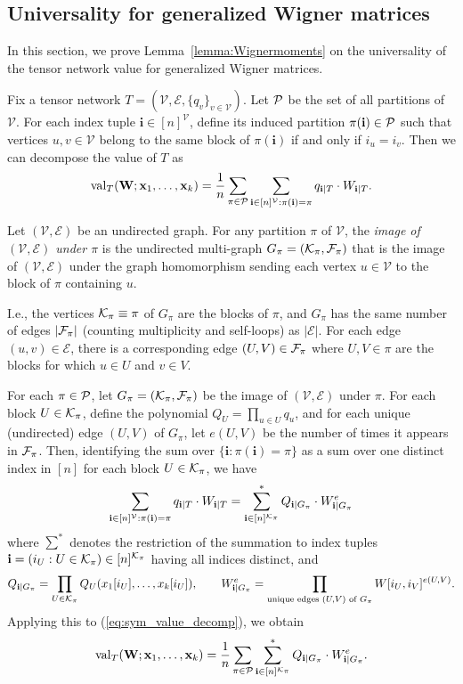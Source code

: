 \documentclass[10pt,reqno]{amsart}
\def\cV{\mathcal{V}}
\def\cE{\mathcal{E}}
\def\val{\operatorname{val}}
\def\bW{{\mathbf{W}}}
\def\bi{\mathbf{i}}
\begin{document}
\subsection{Universality for generalized Wigner matrices}\label{sec:wigner}

In this section, we prove
Lemma~\ref{lemma:Wignermoments} on the universality of the tensor
network value for generalized Wigner matrices.

Fix a tensor network $T = (\cV, \cE, \{q_v\}_{v \in \cV})$.
Let $\mathcal{P}$ be the set of all partitions of $\cV$. For each
index tuple $\bi \in [n]^\cV$, define its induced partition $\pi(\bi) \in \cP$
such that vertices $u,v \in \cV$ belong to the same block of $\pi(\bi)$
if and only if $i_u=i_v$. 
Then we can decompose the value of $T$ as
\begin{align}\label{eq:sym_value_decomp}
    \val_T(\bW; \xb_1, \ldots, \xb_k) = \frac{1}{n}
\sum_{\pi \in \cP} \sum_{\bi \in [n]^\cV:\pi(\bi)=\pi} q_{\bi|T} \cdot W_{\bi|T}.
\end{align}

\begin{definition}\label{def:graphpartition}
Let $(\cV,\cE)$ be an undirected graph. For any partition $\pi$ of $\cV$,
the \emph{image of $(\cV,\cE)$ under $\pi$} is the undirected
multi-graph $G_\pi=(\mathcal{K}_\pi,\mathcal{F}_\pi)$ that is the image of $(\cV,\cE)$ under the
graph homomorphism sending each vertex $u \in \cV$ to the block of $\pi$
containing $u$.

I.e., the vertices $\mathcal{K}_\pi \equiv \pi$ of $G_\pi$ are
the blocks of $\pi$, and $G_\pi$ has the same number of edges $|\mathcal{F}_\pi|$
(counting multiplicity and self-loops) as $|\cE|$.
For each edge $(u,v) \in \cE$, there is a
corresponding edge $(U,V) \in \mathcal{F}_\pi$ where $U,V \in \pi$ are the blocks
for which $u \in U$ and $v \in V$.
\end{definition}

For each $\pi \in \mathcal{P}$, let $G_\pi=(\mathcal{K}_\pi,\mathcal{F}_\pi)$ be the image of
$(\cV,\cE)$ under $\pi$.
For each block $U \in \mathcal{K}_\pi$, define the polynomial $Q_U=\prod_{u \in U} q_u$,
and for each unique (undirected) edge $(U,V)$ of $G_\pi$,
let $e(U,V)$ be the number of times it appears in $\mathcal{F}_\pi$.
Then, identifying the sum over $\{\bi:\pi(\bi)=\pi\}$ as a sum
over one distinct index in $[n]$ for each block $U \in \mathcal{K}_\pi$, we have
\[\sum_{\ib \in [n]^{\cV}:\pi(\bi)=\pi} q_{\bi|T} \cdot W_{\bi|T}
=\sum_{\bi \in [n]^{\cK_\pi}}^* Q_{\bi|G_\pi} \cdot W_{\bi|G_\pi}^e\]
where $\overset{*}{\sum}$ denotes the restriction of the summation to index tuples
$\bi=(i_U:U \in \cK_\pi) \in [n]^{\cK_\pi}$ having all indices distinct, and
\[Q_{\bi|G_\pi}=\prod_{U \in \cK_\pi} Q_U(x_1[i_U], \ldots, x_k[i_U]),
\qquad W_{\bi|G_\pi}^e=\prod_{\text{unique edges } (U,V) \text{ of } G_\pi}
W[i_U,i_V]^{e(U,V)}.\]
Applying this to (\ref{eq:sym_value_decomp}), we obtain
\begin{align}\label{eq:sym_value_decomp2}
\val_T(\bW; \xb_1, \ldots, \xb_k) = \frac{1}{n} \sum_{\pi \in \cP}
\sum_{\ib \in [n]^{\cK_\pi}}^* Q_{\bi|G_\pi} \cdot W_{\bi|G_\pi}^e.    
\end{align}
\end{document}
